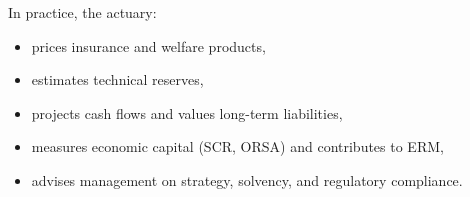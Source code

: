 \begin{f}[Actuary]
	
	In practice, the actuary:
	\begin{itemize}[nosep]
		\item prices insurance and welfare products,
		\item estimates technical reserves,
		\item projects cash flows and values long-term liabilities,
		\item measures economic capital (SCR, ORSA) and contributes to ERM,
		\item advises management on strategy, solvency, and regulatory compliance.
	\end{itemize}
	
\end{f}